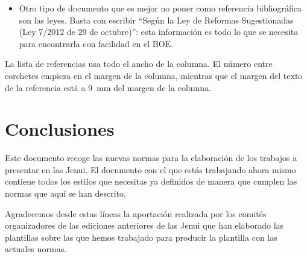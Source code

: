 \documentclass[twocolumn,twoside,a4paper, 10pt]{article}
\begin{document}
\begin{itemize}
	\item Otro tipo de documento que es mejor no poner como referencia 
	bibliográfica son las leyes. Basta con escribir ``Según la Ley de 
	Reformas Sugestionadas (Ley 7/2012 de 29 de octubre)'': esta 
	información es todo lo que se necesita para encontrarla con 
	facilidad en el BOE.
\end{itemize}

La lista de referencias usa todo el ancho de la columna.  El número 
entre corchetes empieza en el margen de la columna, mientras que el margen
del texto de la referencia está a 9~mm del margen de la columna.


\section{Conclusiones}

Este documento recoge las nuevas normas para la elaboración de los trabajos 
a presentar en las Jenui. El documento con el que estás trabajando ahora 
mismo contiene todos los estilos que necesitas ya definidos de manera que 
cumplen las normas que aquí se han descrito.

Agradecemos desde estas líneas la aportación realizada por los comités 
organizadores de las ediciones anteriores de las Jenui que han elaborado 
las plantillas sobre las que hemos trabajado para producir la plantilla 
con las actuales normas.
\balance{}

\nocite{*}

\end{document}
